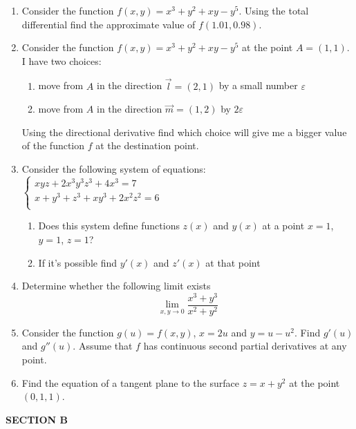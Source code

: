 \begin{enumerate}
\item Consider the function $f(x,y)=x^3+y^2+xy-y^5$. Using the total differential find the approximate value of $f(1.01,0.98)$.
\item Consider the function $f(x,y)=x^3+y^2+xy-y^5$ at the point $A=(1,1)$. I have two choices:
\begin{enumerate}
\item move from $A$ in the direction $\vec{l}=(2,1)$ by a small number $\varepsilon$
\item move from $A$ in the direction $\vec{m}=(1,2)$ by $2\varepsilon$
\end{enumerate}
Using the directional derivative find which choice will give me a bigger value of the function $f$ at the destination point.

\item Consider the following system of equations:\\
$\left\{\begin{array}{l}
xyz+2x^3y^3z^3+4x^3=7\\
x+y^3+z^3+xy^3+2x^2z^2=6\\
\end{array}\right.$
\begin{enumerate}
\item Does this system define functions $z(x)$ and $y(x)$ at a point $x=1$, $y=1$, $z=1$?
\item If it's possible find $y'(x)$ and $z'(x)$ at that point
\end{enumerate}

\item Determine whether the following limit exists
\begin{equation} \nonumber
\lim_{x, y\to 0} \frac{x^3+y^3}{x^2+y^2}
\end{equation}

\item Consider the function $g(u)=f(x,y)$, $x=2u$ and $y=u-u^2$. Find $g'(u)$ and $g''(u)$. Assume that $f$ has continuous second partial derivatives at any point.

\item Find the equation of a tangent plane to the surface $z=x+y^2$ at the point $(0,1,1)$.



\end{enumerate}

\vspace{20pt}
\textbf{SECTION B}
\vspace{20pt}

